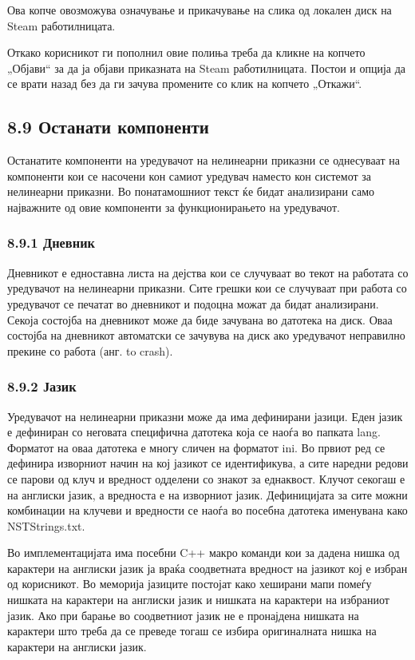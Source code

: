 Ова копче овозможува означување и прикачување на слика од локален диск на Steam работилницата.

Откако корисникот ги пополнил овие полиња треба да кликне на копчето „Објави“ за да ја објави приказната на Steam работилницата. Постои и опција да се врати назад без да ги зачува промените со клик на копчето „Откажи“.

\subsection{8.9 Останати компоненти}

Останатите компоненти на уредувачот на нелинеарни приказни се однесуваат на компоненти кои се насочени кон самиот уредувач наместо кон системот за нелинеарни приказни. Во понатамошниот текст ќе бидат анализирани само најважните од овие компоненти за функционирањето на уредувачот.


\subsubsection{8.9.1 Дневник}

Дневникот е едноставна листа на дејства кои се случуваат во текот на работата со уредувачот на нелинеарни приказни. Сите грешки кои се случуваат при работа со уредувачот се печатат во дневникот и подоцна можат да бидат анализирани. Секоја состојба на дневникот може да биде зачувана во датотека на диск. Оваа состојба на дневникот автоматски се зачувува на диск ако уредувачот неправилно прекине со работа (анг. to crash).

\subsubsection{8.9.2 Јазик}

Уредувачот на нелинеарни приказни може да има дефинирани јазици. Еден јазик е дефиниран со неговата специфична датотека која се наоѓа во папката lang. Форматот на оваа датотека е многу сличен на форматот ini. Во првиот ред се дефинира изворниот начин на кој јазикот се идентификува, а сите наредни редови се парови од клуч и вредност одделени со знакот за еднаквост. Клучот секогаш е на англиски јазик, а вредноста е на изворниот јазик. Дефиницијата за сите можни комбинации на клучеви и вредности се наоѓа во посебна датотека именувана како NSTStrings.txt.

Во имплементацијата има посебни C++ макро команди кои за дадена нишка од карактери на англиски јазик ја враќа соодветната вредност на јазикот кој е избран од корисникот. Во меморија јазиците постојат како хеширани мапи помеѓу нишката на карактери на англиски јазик и нишката на карактери на избраниот јазик. Ако при барање во соодветниот јазик не е пронајдена нишката на карактери што треба да се преведе тогаш се избира оригиналната нишка на карактери на англиски јазик.

